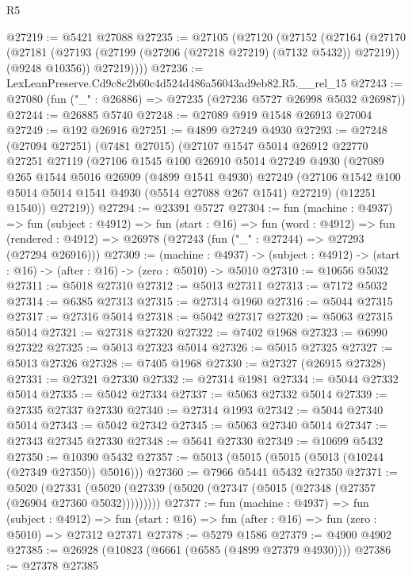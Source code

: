\begin{lexlean}{R5}
\begin{coremodule}
@27219 := @5421 @27088
@27235 := @27105
    (@27120
      (@27152
        (@27164
          (@27170
            (@27181 (@27193 (@27199 (@27206 (@27218 @27219) (@7132 @5432)) @27219)) (@9248 @10356))
            @27219))))
@27236 := LexLeanPreserve.Cd9c8c2b60c4d524d486a56043ad9eb82.R5.__rel_15
@27243 := @27080 (fun ("_" : @26886) => @27235 (@27236 @5727 @26998 @5032 @26987))
@27244 := @26885 @5740
@27248 := @27089 @919 @1548 @26913 @27004
@27249 := @192 @26916
@27251 := @4899 @27249 @4930
@27293 := @27248
    (@27094 @27251)
    (@7481 @27015)
    (@27107
      @1547
      @5014
      @26912
      @22770
      @27251
      @27119
      (@27106
        @1545
        @100
        @26910
        @5014
        @27249
        @4930
        (@27089
          @265
          @1544
          @5016
          @26909
          (@4899 @1541 @4930)
          @27249
          (@27106 @1542 @100 @5014 @5014 @1541 @4930 (@5514 @27088 @267 @1541) @27219)
          (@12251 @1540))
        @27219))
@27294 := @23391 @5727
@27304 := fun (machine : @4937) =>
  fun (subject : @4912) =>
  fun (start : @16) =>
  fun (word : @4912) =>
  fun (rendered : @4912) => @26978 (@27243 (fun ("_" : @27244) => @27293 (@27294 @26916)))
@27309 := (machine : @4937) ->
  (subject : @4912) -> (start : @16) -> (after : @16) -> (zero : @5010) -> @5010
@27310 := @10656 @5032
@27311 := @5018 @27310
@27312 := @5013 @27311
@27313 := @7172 @5032
@27314 := @6385 @27313
@27315 := @27314 @1960
@27316 := @5044 @27315
@27317 := @27316 @5014
@27318 := @5042 @27317
@27320 := @5063 @27315 @5014
@27321 := @27318 @27320
@27322 := @7402 @1968
@27323 := @6990 @27322
@27325 := @5013 @27323 @5014
@27326 := @5015 @27325
@27327 := @5013 @27326
@27328 := @7405 @1968
@27330 := @27327 (@26915 @27328)
@27331 := @27321 @27330
@27332 := @27314 @1981
@27334 := @5044 @27332 @5014
@27335 := @5042 @27334
@27337 := @5063 @27332 @5014
@27339 := @27335 @27337 @27330
@27340 := @27314 @1993
@27342 := @5044 @27340 @5014
@27343 := @5042 @27342
@27345 := @5063 @27340 @5014
@27347 := @27343 @27345 @27330
@27348 := @5641 @27330
@27349 := @10699 @5432
@27350 := @10390 @5432
@27357 := @5013 (@5015 (@5015 (@5013 (@10244 (@27349 @27350)) @5016)))
@27360 := @7966 @5441 @5432 @27350
@27371 := @5020
    (@27331 (@5020 (@27339 (@5020 (@27347 (@5015 (@27348 (@27357 (@26904 @27360 @5032)))))))))
@27377 := fun (machine : @4937) =>
  fun (subject : @4912) =>
  fun (start : @16) => fun (after : @16) => fun (zero : @5010) => @27312 @27371
@27378 := @5279 @1586
@27379 := @4900 @4902
@27385 := @26928 (@10823 (@6661 (@6585 (@4899 @27379 @4930))))
@27386 := @27378 @27385

\end{coremodule}
\end{lexlean}
